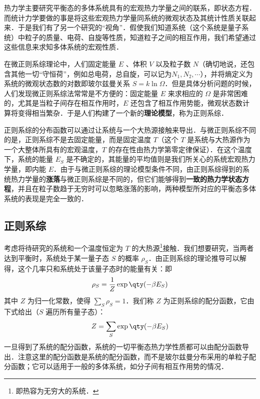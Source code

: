 
\begin{issues}
\issueDraft
\end{issues}

热力学主要研究平衡态的多体系统具有的宏观热力学量之间的联系，即状态方程．而统计力学要做的事是将这些宏观热力学量同系统的微观状态及其统计性质关联起来．于是我们有了另一个研究的“视角”．假使我们知道系统（这个系统是量子系统）中粒子的质量、电荷、自旋等性质，知道粒子之间的相互作用，我们希望通过这些信息来求知多体系统的宏观性质．

在微正则系综理论中，人们固定能量 $E$ 、体积 $V$ 以及粒子数 $N$（确切地说，还包含其他一切“守恒荷”，例如总电荷，总自旋，可以记为$N_1,N_2,\cdots$），并将熵定义为系统的微观状态数的对数即玻尔兹曼关系 $S=k\ln \Omega$．但是具体分析问题的时候，人们发现微正则系综法常常是不方便的：固定能量 $E$ 来求相应的 $\Omega$ 是非常困难的，尤其是当粒子间存在相互作用时，$E$ 还包含了相互作用势能，微观状态数计算将变得相当繁杂．于是人们构建了一个新的\textbf{理论模型}，称为正则系综．

正则系综的分布函数可以通过让系统与一个大热源接触来导出．与微正则系综不同的是，正则系综不是去固定能量，而是固定温度 $T$（这个 $T$ 是系统与大热源作为一个大整体所具有的宏观温度，$T$ 的存在性由热力学第零定律保证）．在这个温度下，系统的能量 $E_S$ 是不确定的，其能量的平均值则是我们所关心的系统宏观热力学量，即内能 $E$．由于与微正则系综的理论模型条件不同，由正则系综得到的系统热力学量的\textbf{涨落}与微正则系综是不同的，但它们能够得到\textbf{一致的热力学状态方程}，并且在粒子数趋于无穷时可以忽略涨落的影响，两种模型所对应的平衡态多体系统的表现是完全一致的．
\subsection{正则系综}
考虑将待研究的系统和一个温度恒定为 $T$ 的大热源\footnote{即热容为无穷大的系统．}接触．我们想要研究，当两者达到平衡时，系统处于某一量子态 $S$ 的概率 $\rho_S$．由正则系综的理论推导可以解得，这个几率只和系统处于该量子态时的能量有关：即
\begin{equation}\label{CEsb_eq1}
\rho_S=\frac{1}{Z}\exp\qty(-\beta E_S)
\end{equation}
其中 $Z$ 为归一化常数，使得 $\sum_S \rho_S=1$．我们称 $Z$ 为正则系综的配分函数，它由下式给出（$S$ 遍历所有量子态）：
\begin{equation}
Z=\sum_S \exp\qty(-\beta E_S)
\end{equation}
一旦得到了系统的配分函数，系统的一切平衡态热力学性质都可以由配分函数导出．注意这里的配分函数是系统的配分函数，而不是玻尔兹曼分布采用的单粒子配分函数；它可以适用于一般的多体系统，如分子间有相互作用势的情况．
